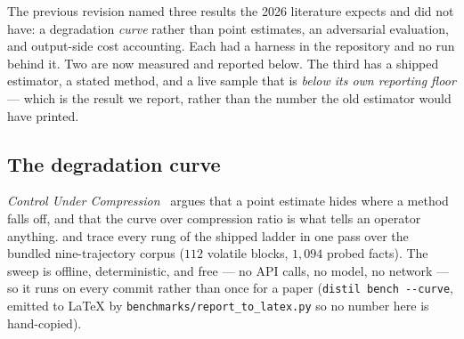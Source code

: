 \documentclass[11pt]{article}
\begin{document}
The previous revision named three results the 2026 literature expects and did not have: a
degradation \emph{curve} rather than point estimates, an adversarial evaluation, and
output-side cost accounting. Each had a harness in the repository and no run behind it.
Two are now measured and reported below. The third has a shipped estimator, a stated
method, and a live sample that is \emph{below its own reporting floor} --- which is the
result we report, rather than the number the old estimator would have printed.

\subsection{The degradation curve}
\label{sec:todo-curve}

\emph{Control Under Compression}~\cite{controlcompression} argues that a point estimate
hides where a method falls off, and that the curve over compression ratio is what tells an
operator anything.  and  trace every rung of the shipped
ladder in one pass over the bundled nine-trajectory corpus ($112$ volatile blocks,
$1{,}094$ probed facts). The sweep is offline, deterministic, and free --- no API calls, no
model, no network --- so it runs on every commit rather than once for a paper
(\texttt{distil bench -{}-curve}, emitted to LaTeX by
\texttt{benchmarks/report\_to\_latex.py} so no number here is hand-copied).


\end{document}
